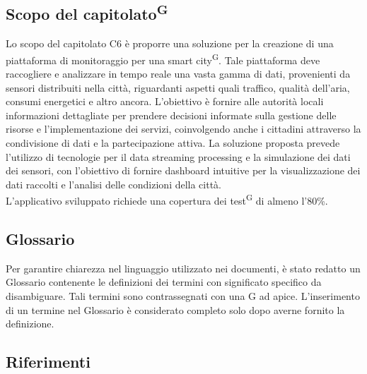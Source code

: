 \documentclass[8pt]{article}
\newcommand{\glossterm}[1]{#1\textsuperscript{G}} %
\begin{document}
\subsection{Scopo del \glossterm{capitolato}}
Lo scopo del capitolato C6 è proporre una soluzione per la creazione di una piattaforma di monitoraggio per una \glossterm{smart city}. Tale piattaforma deve raccogliere e analizzare in tempo reale una vasta gamma di dati, provenienti da sensori distribuiti nella città, riguardanti aspetti quali traffico, qualità dell'aria, consumi energetici e altro ancora. L'obiettivo è fornire alle autorità locali informazioni dettagliate per prendere decisioni informate sulla gestione delle risorse e l'implementazione dei servizi, coinvolgendo anche i cittadini attraverso la condivisione di dati e la partecipazione attiva. La soluzione proposta prevede l'utilizzo di tecnologie per il data streaming processing e la simulazione dei dati dei sensori, con l'obiettivo di fornire dashboard intuitive per la visualizzazione dei dati raccolti e l'analisi delle condizioni della città.\\
L’applicativo sviluppato richiede una copertura dei \glossterm{test} di almeno l’80\%.

\subsection{Glossario}
Per garantire chiarezza nel linguaggio utilizzato nei documenti, è stato redatto un Glossario contenente le definizioni dei termini con significato specifico da disambiguare. Tali termini sono contrassegnati con una G ad apice. L'inserimento di un termine nel Glossario è considerato completo solo dopo averne fornito la definizione.
\subsection{Riferimenti}
\end{document}
